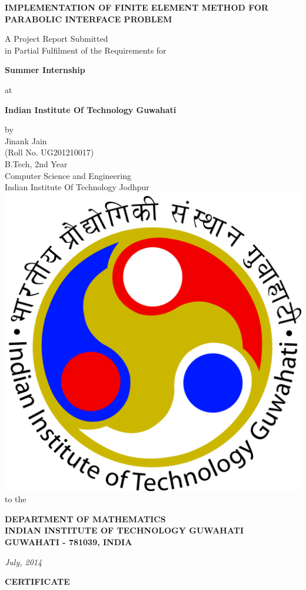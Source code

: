 \documentclass{report}
\numberwithin{equation}{chapter}
\begin{document}
\begin{center}
\begin{spacing}{1.5} { \textbf{ {\Large IMPLEMENTATION OF FINITE ELEMENT METHOD FOR PARABOLIC INTERFACE PROBLEM  \bigskip } } }
\end{spacing}
\bigskip \bigskip \bigskip \bigskip \bigskip A Project Report Submitted \\ in Partial Fulfilment of the Requirements for\\ \begin{spacing}{1.5} {\textbf{ \Large Summer Internship}}\end{spacing}
at \\ \begin{spacing}{1.5} {\textbf{ \Large Indian Institute Of Technology Guwahati \linebreak[5] }}
\end{spacing}
\bigskip\bigskip\bigskip\bigskip
by\\ Jinank Jain\\ (Roll No. UG201210017)\\ B.Tech, 2nd Year\\Computer Science and Engineering\\ Indian Institute Of Technology Jodhpur\\ \bigskip \bigskip
\includegraphics[scale=0.07]{iitg}\\ \bigskip to the\\ 
 \begin{spacing}{1.4} {\textbf{ \large DEPARTMENT OF MATHEMATICS \\ INDIAN INSTITUTE OF TECHNOLOGY GUWAHATI \\ GUWAHATI - 781039, INDIA\\ \bigskip}}\end{spacing}
 \textsl{July, 2014}
 
 \newpage
 {\textbf{ \Large CERTIFICATE\\ \bigskip}}
 \end{center}
 
\end{document}
